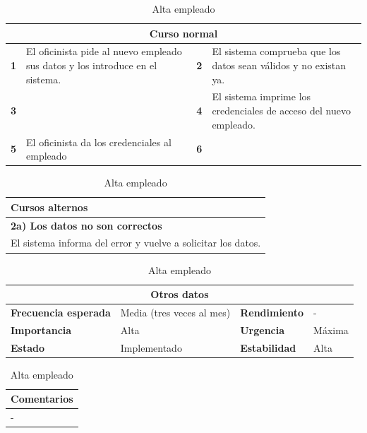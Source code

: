 \documentclass[12pt,spanish]{article}
\begin{document}
\begin{table}[H]
\begin{tabular}{|m{4pt}|m{7.33cm}|m{4pt}|m{7.33cm}|}
\hline
\multicolumn{4}{|c|}{\textbf{Curso normal}} \\
\hline
\textbf{1} & El oficinista pide al nuevo empleado sus datos y los introduce en el sistema. & \textbf{2} & El sistema comprueba que los datos sean válidos y no existan ya. \\
\hline
\textbf{3} &  & \textbf{4} & El sistema imprime los credenciales de acceso del nuevo empleado. \\
\hline
\textbf{5} & El oficinista da los credenciales al empleado & \textbf{6} &  \\
\hline
\end{tabular}

\vspace{1cm}

\begin{tabular}{|m{10pt}|m{7.15cm}|m{10pt}|m{7.15cm}|}
\hline
\multicolumn{4}{|m{16.2cm}|}{\textbf{Cursos alternos}} \\
\hline
\multicolumn{4}{|m{16.2cm}|}{\textbf{2a) Los datos no son correctos}} \\
\hline
\multicolumn{4}{|m{16.2cm}|}{El sistema informa del error y vuelve a solicitar los datos.} \\
\hline
\end{tabular}

\vspace{1cm}

\begin{tabular}{|m{3.72cm}|m{3.72cm}|m{3.72cm}|m{3.72cm}|}
\hline
\multicolumn{4}{|c|}{\textbf{Otros datos}} \\
\hline
\textbf{Frecuencia esperada} & Media (tres veces al mes) & \textbf{Rendimiento} & - \\
\hline
\textbf{Importancia} & Alta & \textbf{Urgencia} & Máxima \\
\hline
\textbf{Estado} & Implementado & \textbf{Estabilidad} & Alta \\
\hline
\end{tabular}

\vspace{1cm}

\begin{tabular}{|m{16.2cm}|}
\hline
\textbf{Comentarios} \\
\hline
- \\
\hline
\end{tabular}

\caption{Alta empleado}

\end{table}
\end{document}
